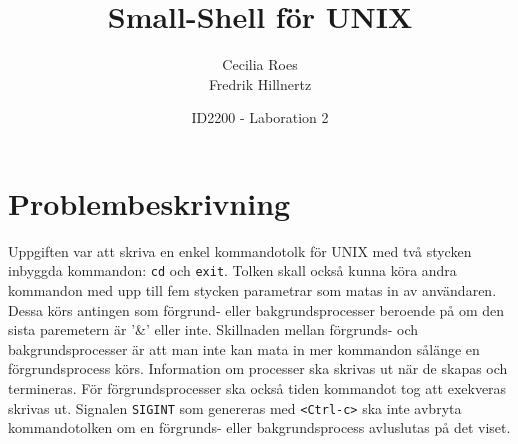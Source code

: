 \documentclass[a4paper]{article}
\title{Small-Shell för UNIX}
\date{ID2200 - Laboration 2}
\author{Cecilia Roes \\ Fredrik Hillnertz}
\begin{document}

\maketitle

\section*{Problembeskrivning}
Uppgiften var att skriva en enkel kommandotolk för UNIX med två stycken inbyggda kommandon: \texttt{cd} och \texttt{exit}. Tolken skall också kunna köra andra kommandon med upp till fem stycken parametrar som matas in av användaren. Dessa körs antingen som förgrund- eller bakgrundsprocesser beroende på om den sista paremetern är '\&' eller inte. Skillnaden mellan förgrunds- och bakgrundsprocesser är att man inte kan mata in mer kommandon sålänge en förgrundsprocess körs. Information om processer ska skrivas ut när de skapas och termineras. För förgrundsprocesser ska också tiden kommandot tog att exekveras skrivas ut. Signalen \texttt{SIGINT} som genereras med \texttt{<Ctrl-c>} ska inte avbryta kommandotolken om en förgrunds- eller bakgrundsprocess avluslutas på det viset. 
\end{document}
